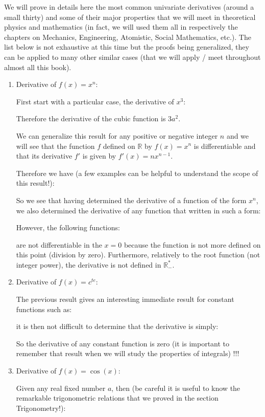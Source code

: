 	 We will prove in details here the most common univariate derivatives (around a small thirty) and some of their major properties that we will meet in theoretical physics and mathematics (in fact, we will used them all in respectively the chapters on Mechanics, Engineering, Atomistic, Social Mathematics, etc.). The list below is not exhaustive at this time but the proofs being generalized, they can be applied to many other similar cases (that we will apply / meet throughout almost all this book).
	 \begin{enumerate}
	 	\item Derivative of $f(x)=x^n$:
	 	
	 	First start with a particular case, the derivative of $x^3$:
	 	
		Therefore the derivative of the cubic function is $3a^2$.
		
		We can generalize this result for any positive or negative integer $n$ and we will see that the function $f$ defined on $\mathbb{R}$ by $f(x)=x^n$ is differentiable and that its derivative $f'$ is given by $f'(x)=nx^{n-1}$.
		 
		 Therefore we have (a few examples can be helpful to understand the scope of this result!):
		 
		 So we see that having determined the derivative of a function of the form $x^n$, we also determined the derivative of any function that written in such a form:
		 
		 However, the following functions:
		 
		 are not differentiable in the $x=0$ because the function is not more defined on this point (division by zero). Furthermore, relatively to the root function (not integer power), the derivative is not defined in $\mathbb{R}_{-}^{*}$.
		 
		 \item Derivative of $f(x)=c^{te}$:
		 
		 The previous result gives an interesting immediate result for constant functions such as:
		 
		 it is then not difficult to determine that the derivative is simply:
		 
		 So the derivative of any constant function is zero (it is important to remember that result when we will study the properties of integrals) !!!
		 \item Derivative of $f(x)=\cos(x)$:
		 
		 Given any real fixed number $a$, then (be careful it is useful to know the remarkable trigonometric relations that we proved in the section Trigonometry!):
		 

\end{enumerate}
